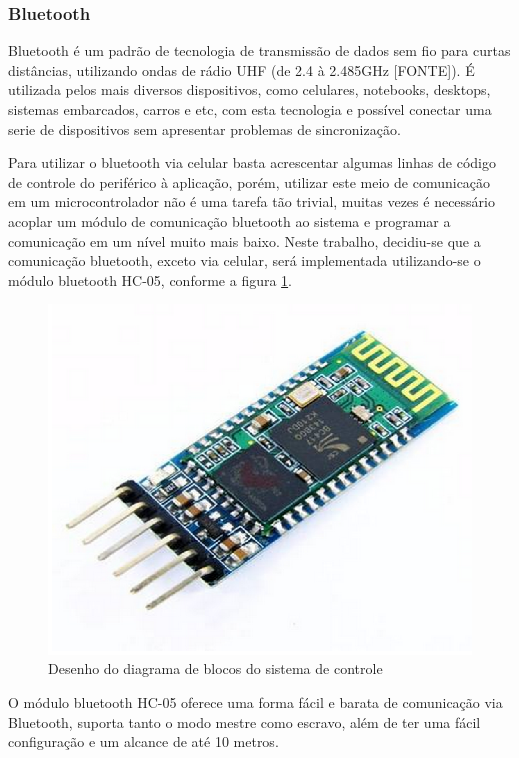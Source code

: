 \subsubsection{Bluetooth}

Bluetooth é um padrão de tecnologia de transmissão de dados sem fio para curtas distâncias, utilizando ondas de rádio UHF (de 2.4 à 2.485GHz [FONTE]). É utilizada pelos mais diversos dispositivos, como celulares, notebooks, desktops, sistemas embarcados, carros e etc, com esta tecnologia e possível conectar uma serie de dispositivos sem apresentar problemas de sincronização.

Para utilizar o bluetooth via celular basta acrescentar algumas linhas de código de controle do periférico à aplicação, porém, utilizar este meio de comunicação em um microcontrolador não é uma tarefa tão trivial, muitas vezes é necessário acoplar um módulo de comunicação bluetooth ao sistema e programar a comunicação em um nível muito mais baixo. Neste trabalho, decidiu-se que a comunicação bluetooth, exceto via celular, será implementada utilizando-se o módulo bluetooth HC-05, conforme a figura \ref{fig:bluetooth}.

\begin{figure}[!htb]
\centering
  \includegraphics[keepaspectratio=true,scale=0.5]{figuras/controle/bluetooth}
\caption{Desenho do diagrama de blocos do sistema de controle}
\label{fig:bluetooth}
\end{figure}

O módulo bluetooth HC-05 oferece uma forma fácil e barata de comunicação via Bluetooth, suporta tanto o modo mestre como escravo, além de ter uma fácil configuração e um alcance de até 10 metros.

